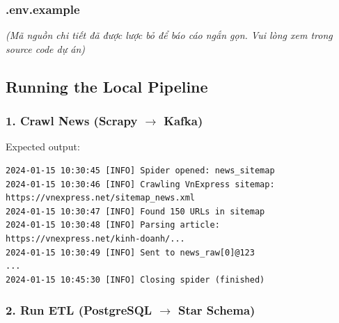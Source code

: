 \hypertarget{env.example}{%
\subsubsection{.env.example}}

\emph{(Mã nguồn chi tiết đã được lược bỏ để báo cáo ngắn gọn. Vui lòng
xem trong source code dự án)}

\hypertarget{running-the-local-pipeline}{%
\subsection{Running the Local
Pipeline}}

\hypertarget{crawl-news-scrapy-rightarrow-kafka}{%
\subsubsection{\texorpdfstring{1. Crawl News (Scrapy \(\rightarrow\)
Kafka)}{1. Crawl News (Scrapy \textbackslash rightarrow Kafka)}}}

\begin{Shaded}
\begin{Highlighting}[]

\end{Highlighting}
\end{Shaded}

Expected output:

\begin{verbatim}
2024-01-15 10:30:45 [INFO] Spider opened: news_sitemap
2024-01-15 10:30:46 [INFO] Crawling VnExpress sitemap: https://vnexpress.net/sitemap_news.xml
2024-01-15 10:30:47 [INFO] Found 150 URLs in sitemap
2024-01-15 10:30:48 [INFO] Parsing article: https://vnexpress.net/kinh-doanh/...
2024-01-15 10:30:49 [INFO] Sent to news_raw[0]@123
...
2024-01-15 10:45:30 [INFO] Closing spider (finished)
\end{verbatim}

\hypertarget{run-etl-postgresql-rightarrow-star-schema}{%
\subsubsection{\texorpdfstring{2. Run ETL (PostgreSQL \(\rightarrow\)
Star
Schema)}{2. Run ETL (PostgreSQL \textbackslash rightarrow Star Schema)}}}

